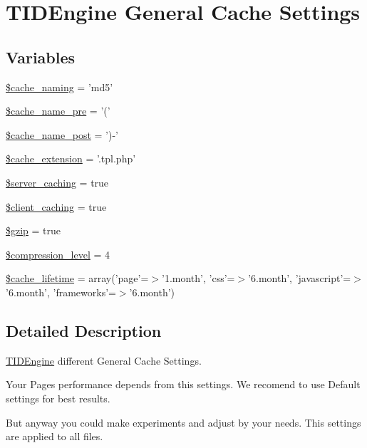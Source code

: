 \hypertarget{group__general__cache__settings}{
\section{TIDEngine General Cache Settings}
\label{group__general__cache__settings}
}
\subsection*{Variables}
\begin{DoxyCompactItemize}
\item 
\hyperlink{group__general__cache__settings_gad3689303b91750b4f90511e1ab46a75c}{\$cache\_\-naming} = 'md5'
\item 
\hyperlink{group__general__cache__settings_gac05f99a6b3c71f3e31e77d5c9ea5914d}{\$cache\_\-name\_\-pre} = '('
\item 
\hyperlink{group__general__cache__settings_ga0b2dfab31e245d074c86967134122b25}{\$cache\_\-name\_\-post} = ')-\/'
\item 
\hyperlink{group__general__cache__settings_gac1516832f9aecd303dcb275d08e97efe}{\$cache\_\-extension} = '.tpl.php'
\item 
\hyperlink{group__general__cache__settings_ga94cbab658bf158b39afd90db1a44e581}{\$server\_\-caching} = true
\item 
\hyperlink{group__general__cache__settings_gaa239a3baf57ffc17ad1cc1911414b539}{\$client\_\-caching} = true
\item 
\hyperlink{group__general__cache__settings_ga5ac8836bca7856f49bf02d7d95c2edd2}{\$gzip} = true
\item 
\hyperlink{group__general__cache__settings_ga9a4e30766e452f0d2feaecd666787ca1}{\$compression\_\-level} = 4
\item 
\hyperlink{group__general__cache__settings_ga5aaab753f75170fa670cbb602aa97119}{\$cache\_\-lifetime} = array('page'=$>$'1.month', 'css'=$>$'6.month', 'javascript'=$>$'6.month', 'frameworks'=$>$'6.month')
\end{DoxyCompactItemize}


\subsection{Detailed Description}
\hyperlink{class_t_i_d_engine}{TIDEngine} different General Cache Settings.

Your Pages performance depends from this settings. We recomend to use Default settings for best results.\par
\par
 But anyway you could make experiments and adjust by your needs. This settings are applied to all files. 

